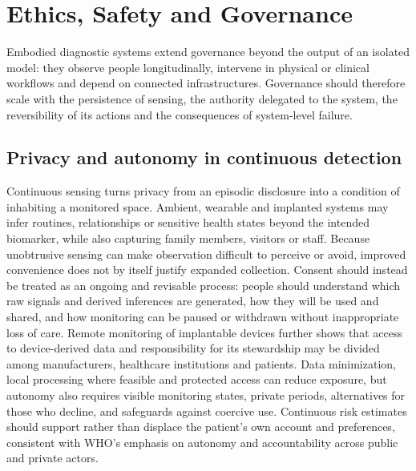 \documentclass[12pt,a4paper]{article}
\begin{document}
\section{Ethics, Safety and Governance}
\label{sec:ethics_safety_governance}
Embodied diagnostic systems extend governance beyond the output of an isolated model: they observe people longitudinally, intervene in physical or clinical workflows and depend on connected infrastructures. Governance should therefore scale with the persistence of sensing, the authority delegated to the system, the reversibility of its actions and the consequences of system-level failure.


\subsection{Privacy and autonomy in continuous detection}
\label{subsec:privacy_autonomy}
Continuous sensing turns privacy from an episodic disclosure into a condition of inhabiting a monitored space. Ambient, wearable and implanted systems may infer routines, relationships or sensitive health states beyond the intended biomarker, while also capturing family members, visitors or staff. Because unobtrusive sensing can make observation difficult to perceive or avoid, improved convenience does not by itself justify expanded collection. Consent should instead be treated as an ongoing and revisable process: people should understand which raw signals and derived inferences are generated, how they will be used and shared, and how monitoring can be paused or withdrawn without inappropriate loss of care. Remote monitoring of implantable devices further shows that access to device-derived data and responsibility for its stewardship may be divided among manufacturers, healthcare institutions and patients. Data minimization, local processing where feasible and protected access can reduce exposure, but autonomy also requires visible monitoring states, private periods, alternatives for those who decline, and safeguards against coercive use. Continuous risk estimates should support rather than displace the patient's own account and preferences, consistent with WHO's emphasis on autonomy and accountability across public and private actors.
\end{document}
